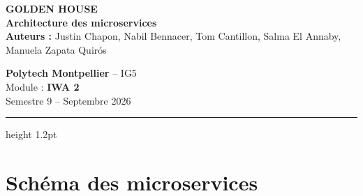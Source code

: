\documentclass[10pt,a4paper]{article}
\begin{document}
\noindent
\begin{minipage}[c]{0.65\textwidth}
    {\LARGE\bfseries\color{primary} GOLDEN HOUSE}\\[2pt]
    {\large\bfseries\color{secondary} Architecture des microservices}\\[3pt]
    {\footnotesize\textbf{Auteurs :} Justin Chapon, Nabil Bennacer, Tom Cantillon, Salma El Annaby, Manuela Zapata Quirós}
\end{minipage}
\hfill
\begin{minipage}[c]{0.32\textwidth}
    \raggedleft\footnotesize
    \textbf{Polytech Montpellier} -- IG5\\
    Module : \textbf{IWA 2}\\
    Semestre 9 -- Septembre 2026
\end{minipage}

\vspace{3pt}
\hrule height 1.2pt
\vspace{5pt}

\section{Schéma des microservices}
\end{document}
